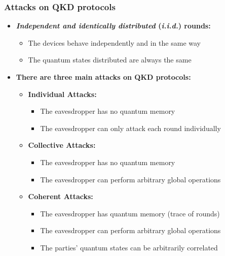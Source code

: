 \documentclass{beamer}
\begin{document}
    \begin{frame}
        \frametitle{\Large Attacks on QKD protocols}

        \vspace{4ex}
        \begin{itemize}
            \item \textbf{\textit{Independent and identically distributed} (\textit{i.i.d.}) rounds:}
            \vspace{-2.5ex}
            \begin{itemize}
                \item The devices behave independently and in the same way
                \item The quantum states distributed are always the same
            \end{itemize}
            \vspace{0.5ex}
            \item \textbf{There are three main attacks on QKD protocols:}
            \begin{itemize}
                \item \textbf{Individual Attacks:}
                \begin{itemize}
                    \footnotesize
                    \item The eavesdropper has no quantum memory\\
                    \footnotesize
                    \item The eavesdropper can only attack each round individually
                \end{itemize}
                \item \textbf{Collective Attacks:}
                \begin{itemize}
                    \footnotesize
                    \item The eavesdropper has no quantum memory\\
                    \footnotesize
                    \item The eavesdropper can perform arbitrary global operations
                \end{itemize}
                \item \textbf{Coherent Attacks:}
                \begin{itemize}
                    \footnotesize
                    \item The eavesdropper has quantum memory (trace of rounds)\\
                    \footnotesize
                    \item The eavesdropper can perform arbitrary global operations\\
                    \footnotesize
                    \item The parties' quantum states can be arbitrarily correlated
                \end{itemize}
            \end{itemize}
        \end{itemize}

    \end{frame}
\end{document}
